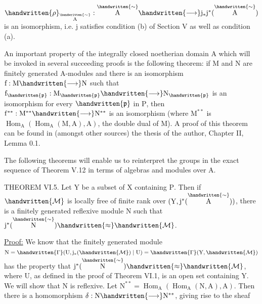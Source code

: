 $\mathrm{\handwritten{\rho}_{\overset{\handwritten{\sim}}{A}}:\overset{\handwritten{\sim}}{A} \handwritten{\longrightarrow} j_*j^*(\overset{\handwritten{\sim}}{A})}$ is an isomorphism, i.e. $\mathrm{j}$ satisfies condition (b)
of Section V as well as condition (a).

An important property of the integrally closed noetherian domain
$\mathrm{A}$ which will be invoked in several succeeding proofs is the following
theorem: if $\mathrm{M}$ and $\mathrm{N}$ are finitely generated $\mathrm{A}$-modules and there
is an isomorphism $\mathrm{f:M \handwritten{\longrightarrow} N}$ such that $\mathrm{f_{\handwritten{\mathfrak p}}:M_{\handwritten{\mathfrak p}} \handwritten{\longrightarrow} N_{\handwritten{\mathfrak p}}}$ is an
isomorphism for every $\mathrm{\handwritten{\mathfrak p}}$ in $\mathrm{P}$, then $\mathrm{f^{**}:M^{**} \handwritten{\longrightarrow} N^{**}}$ is an
isomorphism (where $\mathrm{M^{**}}$ is $\mathrm{\operatorname{Hom}_A(\operatorname{Hom}_A(M,A),A)}$, the double
dual of $\mathrm{M}$). A proof of this theorem can be found in (amongst other
sources) the thesis of the author, Chapter II, Lemma 0.1.

The following theorems will enable us to reinterpret the groups in
the exact sequence of Theorem V.12 in terms of algebras and modules
over $\mathrm{A}$.

THEOREM VI.5. Let $\mathrm{Y}$ be a subset of $\mathrm{X}$ containing $\mathrm{P}$.
Then if $\mathrm{\handwritten{\mathcal M}}$ is locally free of finite rank over $\mathrm{(Y,j^*(\overset{\handwritten{\sim}}{A}))}$, there is a
finitely generated reflexive module $\mathrm{N}$ such that $\mathrm{j^*(\overset{\handwritten{\sim}}{N}) \handwritten{\approx} \handwritten{\mathcal M}}$.

\uline{Proof:} We know that the finitely generated module
$\mathrm{N=\handwritten{\Gamma}(U,j_*(\handwritten{\mathcal M})\mid U)=\handwritten{\Gamma}(Y,\handwritten{\mathcal M})}$ has the property that $\mathrm{j^*(\overset{\handwritten{\sim}}{N}) \handwritten{\approx} \handwritten{\mathcal M}}$, where
$\mathrm{U}$, as defined in the proof of Theorem VI.1, is an open set containing
$\mathrm{Y}$. We will show that $\mathrm{N}$ is reflexive. Let $\mathrm{N^{**}=\operatorname{Hom}_A(\operatorname{Hom}_A(N,A),A)}$.
Then there is a homomorphism $\mathrm{\delta:N \handwritten{\longrightarrow} N^{**}}$, giving rise to the sheaf

